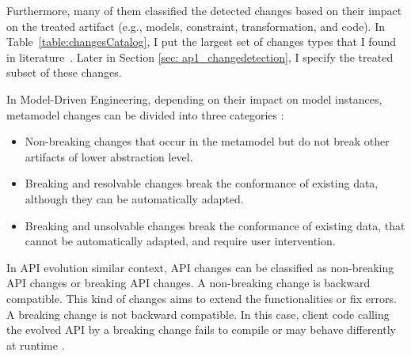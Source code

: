   Furthermore, many of them classified the detected changes based on their impact on the treated artifact (e.g., models, constraint, transformation, and code). In Table~\ref{table:changesCatalog}, I put the largest set of changes types that I found in literature~\cite{herrmannsdoerfer_extensive_2011}. Later in Section \ref{sec: ap1_changedetection}, I specify the treated subset of these changes. 
  
  In Model-Driven Engineering, depending on their impact on model instances, metamodel changes can be divided into three categories \cite{gruschko2007towards}:
 \begin{itemize}
 	
 	\item	Non-breaking changes that occur in the metamodel but do not break other artifacts of lower abstraction level.%
 	\item Breaking and resolvable changes break the conformance of existing data, although they can be automatically adapted.
 	\item Breaking and unsolvable changes break the conformance of existing data, that cannot be automatically adapted, and require user intervention.
 \end{itemize}
 
 In API evolution similar context, API changes can be classified as non-breaking API changes or breaking API changes. A non-breaking change is backward compatible. This kind of changes aims to extend the functionalities or fix errors. A breaking change is not backward compatible. In this case, client code calling the evolved API by a breaking change fails to compile or may behave differently at runtime \cite{dig2006apis}.
 
